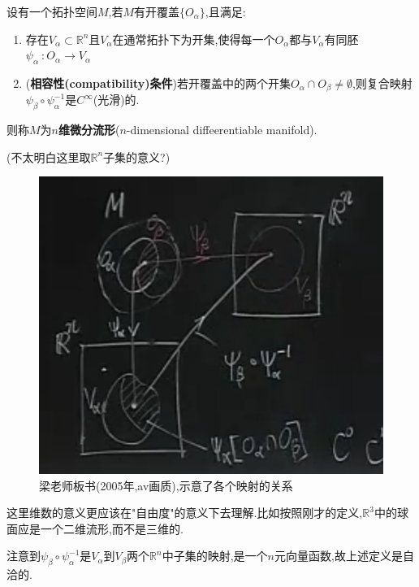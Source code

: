 \documentclass[UTF8]{article}
\begin{document}
	\begin{differentiableManifold}
		
		设有一个拓扑空间$M$,若$M$有开覆盖$\{O_{\alpha}\}$,且满足:
		
		\begin{enumerate}
			
			\item 存在$V_{\alpha} \subset \mathbb{R}^n$且$V_{\alpha}$在通常拓扑下为开集,使得每一个$O_{\alpha}$都与$V_{\alpha}$有同胚$\psi_{\alpha}~:O_{\alpha} \to V_{\alpha}$
			
			\item (\textbf{相容性(compatibility)条件})若开覆盖中的两个开集$O_{\alpha} \cap O_{\beta} \ne \emptyset$,则复合映射$\psi_{\beta} \circ \psi_{\alpha}^{-1}$是$C^{\infty}$(光滑)的.
			
		\end{enumerate}
	
		则称$M$为\textbf{$n$维微分流形}($n$-dimensional diffeerentiable manifold).
		
	\end{differentiableManifold}
	
	(不太明白这里取$\mathbb{R}^n$子集的意义?)
	
	\begin{figure}[H]
		\centering
		\includegraphics[width=0.7\linewidth]{pics/QQ截图20210725215644}
		\caption{梁老师板书(2005年,av画质),示意了各个映射的关系}
		\label{fig:qq20210725215644}
	\end{figure}
	
	这里维数的意义更应该在"自由度"的意义下去理解.比如按照刚才的定义,$\mathbb{R}^3$中的球面应是一个二维流形,而不是三维的.
	
	注意到$\psi_{\beta} \circ \psi_{\alpha}^{-1}$是$V_{\alpha}$到$V_{\beta}$两个$\mathbb{R}^n$中子集的映射,是一个$n$元向量函数,故上述定义是自洽的.
	
\end{document}
